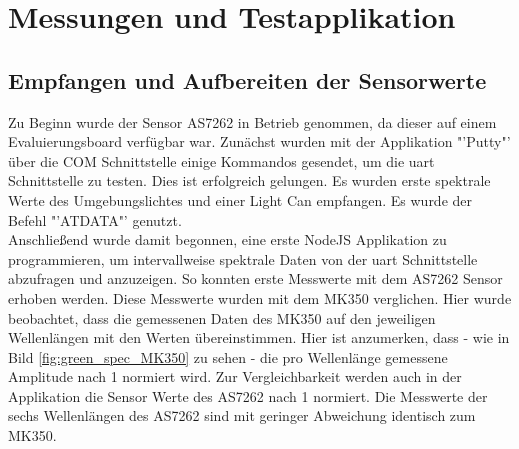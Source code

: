 \documentclass[11pt]{scrartcl}
\begin{document}
\section{Messungen und Testapplikation}
\subsection{Empfangen und Aufbereiten der Sensorwerte}
Zu Beginn wurde der Sensor AS7262 in Betrieb genommen, da dieser auf einem Evaluierungsboard verfügbar war.
Zunächst wurden mit der Applikation "'Putty"' über die COM Schnittstelle einige Kommandos gesendet, um die
\ac{uart} Schnittstelle zu testen. Dies ist erfolgreich gelungen. Es wurden erste spektrale Werte des
Umgebungslichtes und einer Light Can empfangen. Es wurde der Befehl "'ATDATA"' genutzt.\\
Anschließend wurde damit begonnen, eine erste NodeJS Applikation zu programmieren, um intervallweise spektrale Daten
von der \ac{uart} Schnittstelle abzufragen und anzuzeigen. So konnten erste Messwerte mit dem AS7262 Sensor erhoben werden.
Diese Messwerte wurden mit dem MK350 verglichen. Hier wurde beobachtet, dass die gemessenen Daten des MK350 auf den jeweiligen
Wellenlängen mit den Werten übereinstimmen. Hier ist anzumerken, dass - wie in Bild \ref{fig:green_spec_MK350} zu sehen - die pro Wellenlänge
gemessene Amplitude nach 1 normiert wird. Zur Vergleichbarkeit werden auch in der Applikation die Sensor Werte des AS7262 nach
1 normiert. Die Messwerte der sechs Wellenlängen des AS7262 sind mit geringer Abweichung identisch zum MK350.\\
\end{document}
